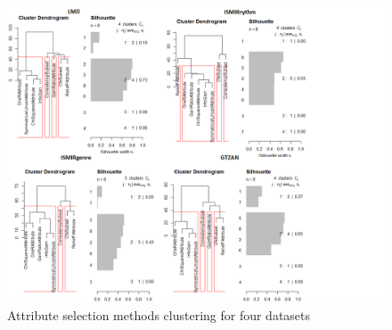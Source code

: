 \begin{figure}[p]
\begin{center}
\includegraphics[scale=0.5]{fig/diagram_all.png}
\caption{Attribute selection methods clustering for four datasets
\label{fig:clustering}}
\end{center}
\end{figure}
